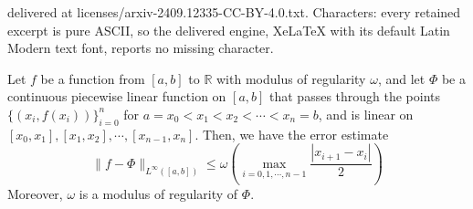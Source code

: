 \documentclass[10pt,a4paper]{amsart}
\begin{document}
delivered at licenses/arxiv-2409.12335-CC-BY-4.0.txt. Characters: every retained excerpt is pure ASCII, so the delivered engine, XeLaTeX with its default Latin Modern text font, reports no missing character.
\begin{lemma}
\label{lem:continuous_piecewise_linear_approximators_preserve_regularity}
    Let $f$ be a function from $[a,b]$ to $\mathbb{R}$ with modulus of regularity $\omega$, and let $\Phi$ be a continuous piecewise linear function on $[a,b]$ that passes through the points $\{(x_i,f(x_i))\}_{i=0}^n$ for $a=x_0<x_1<x_2<\cdots<x_n=b$, and is linear on $[x_0,x_1],[x_1,x_2],\cdots,[x_{n-1},x_n]$. Then, we have the error estimate 
    $$\| f-\Phi \|_{L^{\infty}([a,b])} \le \omega \left(
    \max\limits_{i=0,1,\cdots,n-1}{\frac{|x_{i+1}-x_i|}{2}}
    \right)$$
    Moreover, $\omega$ is a modulus of regularity of $\Phi$. 
\end{lemma}
\end{document}
